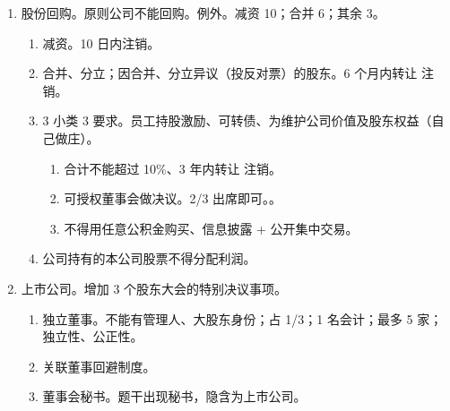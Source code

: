 \begin{enumerate}
\begin{enumerate}
        \end{enumerate}
  \item 股份回购。原则公司不能回购。例外。减资 10；合并 6；其余 3。
        \begin{enumerate}
          \item 减资。10 日内注销。
          \item 合并、分立；因合并、分立异议（投反对票）的股东。6 个月内转让 \hz 注销。
          \item 3 小类 3 要求。员工持股激励、可转债、为维护公司价值及股东权益（自己做庄）。
                \begin{enumerate}
                  \item 合计不能超过 10\%、3 年内转让 \hz 注销。
                  \item 可授权董事会做决议。2/3 出席即可。。
                  \item 不得用任意公积金购买、信息披露 + 公开集中交易。
                \end{enumerate}
          \item 公司持有的本公司股票不得分配利润。
        \end{enumerate}
  \item 上市公司。增加 3 个股东大会的特别决议事项。
        \begin{enumerate}
          \item 独立董事。不能有管理人、大股东身份；占 1/3；1 名会计；最多 5 家；独立性、公正性。
          \item 关联董事回避制度。
          \item 董事会秘书。题干出现秘书，隐含为上市公司。
        \end{enumerate}
\end{enumerate}
